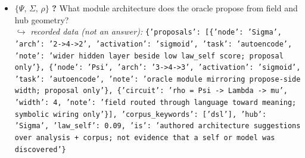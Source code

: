 \documentclass[11pt]{article}
\begin{document}
\begin{itemize}
\item $\{\Psi,\,\Sigma,\,\rho\}$ \quad \textbf{?} What module architecture does the oracle propose from field and hub geometry? \\ \hspace*{1em}$\hookrightarrow$ \emph{recorded data (not an answer):} \texttt{\{'proposals': [\{'node': 'Sigma', 'arch': '2->4->2', 'activation': 'sigmoid', 'task': 'autoencode', 'note': 'wider hidden layer beside low law\_self score; proposal only'\}, \{'node': 'Psi', 'arch': '3->4->3', 'activation': 'sigmoid', 'task': 'autoencode', 'note': 'oracle module mirroring propose-side width; proposal only'\}, \{'circuit': 'rho = Psi -> Lambda -> mu', 'width': 4, 'note': 'field routed through language toward meaning; symbolic wiring only'\}], 'corpus\_keywords': ['dsl'], 'hub': 'Sigma', 'law\_self': 0.09, 'is': 'authored architecture suggestions over analysis + corpus; not evidence that a self or model was discovered'\}}\end{itemize}
\end{document}
